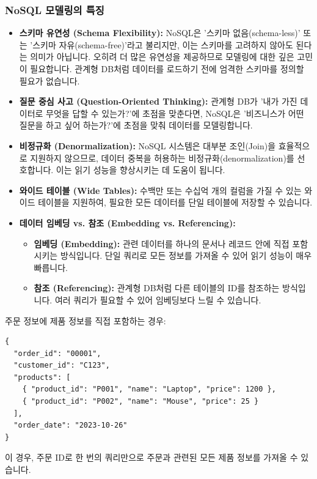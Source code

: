 \documentclass[11pt,a4paper]{article}
\begin{document}
\subsubsection{NoSQL 모델링의 특징}
\begin{itemize}
    \item \textbf{스키마 유연성 (Schema Flexibility):} NoSQL은 '스키마 없음(schema-less)' 또는 '스키마 자유(schema-free)'라고 불리지만, 이는 스키마를 고려하지 않아도 된다는 의미가 아닙니다. 오히려 더 많은 유연성을 제공하므로 모델링에 대한 깊은 고민이 필요합니다. 관계형 DB처럼 데이터를 로드하기 전에 엄격한 스키마를 정의할 필요가 없습니다.
    \item \textbf{질문 중심 사고 (Question-Oriented Thinking):} 관계형 DB가 '내가 가진 데이터로 무엇을 답할 수 있는가?'에 초점을 맞춘다면, NoSQL은 '비즈니스가 어떤 질문을 하고 싶어 하는가?'에 초점을 맞춰 데이터를 모델링합니다.
    \item \textbf{비정규화 (Denormalization):} NoSQL 시스템은 대부분 조인(Join)을 효율적으로 지원하지 않으므로, 데이터 중복을 허용하는 비정규화(denormalization)를 선호합니다. 이는 읽기 성능을 향상시키는 데 도움이 됩니다.
    \item \textbf{와이드 테이블 (Wide Tables):} 수백만 또는 수십억 개의 컬럼을 가질 수 있는 와이드 테이블을 지원하여, 필요한 모든 데이터를 단일 테이블에 저장할 수 있습니다.
    \item \textbf{데이터 임베딩 vs. 참조 (Embedding vs. Referencing):}
    \begin{itemize}
        \item \textbf{임베딩 (Embedding):} 관련 데이터를 하나의 문서나 레코드 안에 직접 포함시키는 방식입니다. 단일 쿼리로 모든 정보를 가져올 수 있어 읽기 성능이 매우 빠릅니다.
        \item \textbf{참조 (Referencing):} 관계형 DB처럼 다른 테이블의 ID를 참조하는 방식입니다. 여러 쿼리가 필요할 수 있어 임베딩보다 느릴 수 있습니다.
    \end{itemize}
\end{itemize}

\begin{examplebox}[examplebox, title=데이터 임베딩 예시]
주문 정보에 제품 정보를 직접 포함하는 경우:
\begin{verbatim}
{
  "order_id": "00001",
  "customer_id": "C123",
  "products": [
    { "product_id": "P001", "name": "Laptop", "price": 1200 },
    { "product_id": "P002", "name": "Mouse", "price": 25 }
  ],
  "order_date": "2023-10-26"
}
\end{verbatim}
이 경우, 주문 ID로 한 번의 쿼리만으로 주문과 관련된 모든 제품 정보를 가져올 수 있습니다.
\end{examplebox}
\end{document}
